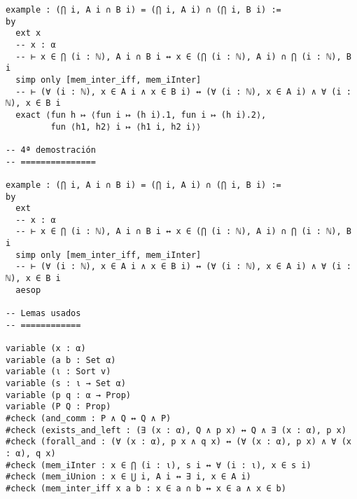 \begin{verbatim}
example : (⋂ i, A i ∩ B i) = (⋂ i, A i) ∩ (⋂ i, B i) :=
by
  ext x
  -- x : α
  -- ⊢ x ∈ ⋂ (i : ℕ), A i ∩ B i ↔ x ∈ (⋂ (i : ℕ), A i) ∩ ⋂ (i : ℕ), B i
  simp only [mem_inter_iff, mem_iInter]
  -- ⊢ (∀ (i : ℕ), x ∈ A i ∧ x ∈ B i) ↔ (∀ (i : ℕ), x ∈ A i) ∧ ∀ (i : ℕ), x ∈ B i
  exact ⟨fun h ↦ ⟨fun i ↦ (h i).1, fun i ↦ (h i).2⟩,
         fun ⟨h1, h2⟩ i ↦ ⟨h1 i, h2 i⟩⟩

-- 4ª demostración
-- ===============

example : (⋂ i, A i ∩ B i) = (⋂ i, A i) ∩ (⋂ i, B i) :=
by
  ext
  -- x : α
  -- ⊢ x ∈ ⋂ (i : ℕ), A i ∩ B i ↔ x ∈ (⋂ (i : ℕ), A i) ∩ ⋂ (i : ℕ), B i
  simp only [mem_inter_iff, mem_iInter]
  -- ⊢ (∀ (i : ℕ), x ∈ A i ∧ x ∈ B i) ↔ (∀ (i : ℕ), x ∈ A i) ∧ ∀ (i : ℕ), x ∈ B i
  aesop

-- Lemas usados
-- ============

variable (x : α)
variable (a b : Set α)
variable (ι : Sort v)
variable (s : ι → Set α)
variable (p q : α → Prop)
variable (P Q : Prop)
#check (and_comm : P ∧ Q ↔ Q ∧ P)
#check (exists_and_left : (∃ (x : α), Q ∧ p x) ↔ Q ∧ ∃ (x : α), p x)
#check (forall_and : (∀ (x : α), p x ∧ q x) ↔ (∀ (x : α), p x) ∧ ∀ (x : α), q x)
#check (mem_iInter : x ∈ ⋂ (i : ι), s i ↔ ∀ (i : ι), x ∈ s i)
#check (mem_iUnion : x ∈ ⋃ i, A i ↔ ∃ i, x ∈ A i)
#check (mem_inter_iff x a b : x ∈ a ∩ b ↔ x ∈ a ∧ x ∈ b)
\end{verbatim}

